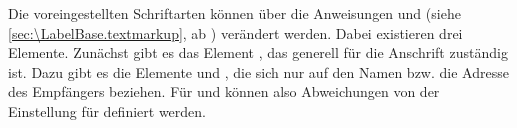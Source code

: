 \BeginIndexGroup
{}%
%
%
Die voreingestellten Schriftarten können
über die Anweisungen  und
 (siehe
\autoref{sec:\LabelBase.textmarkup}, ab
) verändert werden. Dabei existieren
drei Elemente. Zunächst gibt es das Element
%
, das generell für die Anschrift zuständig
ist. Dazu gibt es die Elemente
und %
, die sich nur auf den Namen bzw. die
Adresse des Empfängers beziehen. Für  und
 können also Abweichungen von der Einstellung für
 definiert werden.%
\EndIndexGroup
%
